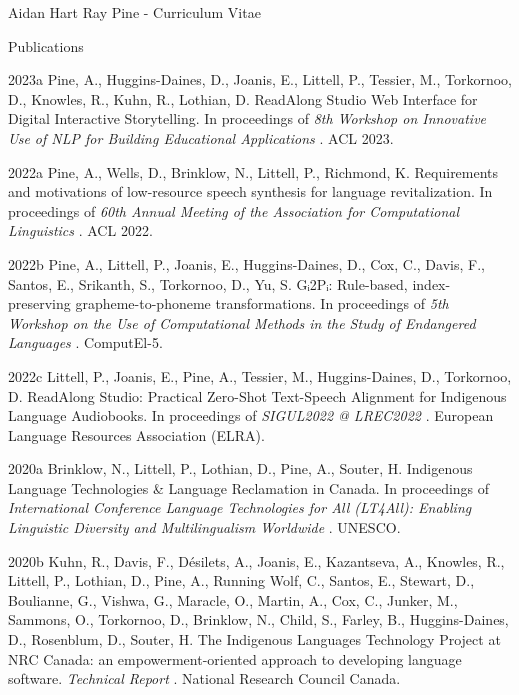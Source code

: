 \documentclass[12pt]{letter}
\begin{document}
\begin{cv}{ Aidan Hart Ray Pine  \space - \space   Curriculum Vitae}
        \begin{cvlist}{Publications}
                                                                        \item[2023a] Pine, A., Huggins-Daines, D., Joanis, E., Littell, P., Tessier, M., Torkornoo, D., Knowles, R., Kuhn, R., Lothian, D.  ReadAlong Studio Web Interface for Digital Interactive Storytelling. In proceedings of \textit{ 8th Workshop on Innovative Use of NLP for Building Educational Applications }.  ACL 2023.  
                                                                                                            \item[2022a] Pine, A., Wells, D., Brinklow, N., Littell, P., Richmond, K.  Requirements and motivations of low-resource speech synthesis for language revitalization. In proceedings of \textit{ 60th Annual Meeting of the Association for Computational Linguistics }.  ACL 2022.  
                                                                                \item[2022b] Pine, A., Littell, P., Joanis, E., Huggins-Daines, D., Cox, C., Davis, F., Santos, E., Srikanth, S., Torkornoo, D., Yu, S.  Gᵢ2Pᵢ: Rule-based, index-preserving grapheme-to-phoneme transformations. In proceedings of \textit{ 5th Workshop on the Use of Computational Methods in the Study of Endangered Languages }.  ComputEl-5.  
                                                                                \item[2022c] Littell, P., Joanis, E., Pine, A., Tessier, M., Huggins-Daines, D., Torkornoo, D.  ReadAlong Studio: Practical Zero-Shot Text-Speech Alignment for Indigenous Language Audiobooks. In proceedings of \textit{ SIGUL2022 @ LREC2022 }.  European Language Resources Association (ELRA).  
                                                                                                            \item[2020a] Brinklow, N., Littell, P., Lothian, D., Pine, A., Souter, H.  Indigenous Language Technologies \& Language Reclamation in Canada. In proceedings of \textit{ International Conference Language Technologies for All (LT4All): Enabling Linguistic Diversity and Multilingualism Worldwide }.  UNESCO.  
                                                                                \item[2020b]  Kuhn,  R.,  Davis,  F.,  D{\'e}silets,  A.,  Joanis,  E.,  Kazantseva,  A.,  Knowles,  R.,  Littell,  P.,  Lothian,  D.,  Pine,  A.,  Running Wolf,  C.,  Santos,  E.,  Stewart,  D.,  Boulianne,  G.,  Vishwa,  G.,  Maracle,  O.,  Martin,  A.,  Cox,  C.,  Junker,  M.,  Sammons,  O.,  Torkornoo,  D.,  Brinklow,  N.,  Child,  S.,  Farley,  B.,  Huggins-Daines,  D.,  Rosenblum,  D.,  Souter,  H.  The Indigenous Languages Technology Project at NRC Canada: an empowerment-oriented approach to developing language software. \textit{ Technical Report }.  National Research Council Canada.  

\end{cvlist}
\end{cv}
\end{document}
